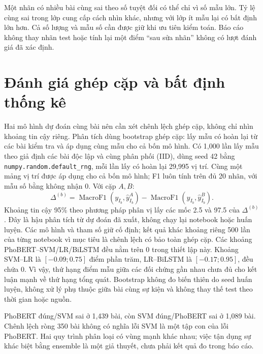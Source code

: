 Một nhãn có nhiều bài cùng sai theo số tuyệt đối có thể chỉ vì số mẫu lớn. Tỷ lệ cùng sai trong lớp cung cấp cách nhìn khác, nhưng với lớp ít mẫu lại có bất định lớn hơn. Cả số lượng và mẫu số cần được giữ khi ưu tiên kiểm toán. Báo cáo không thay nhãn test hoặc tính lại một điểm ``sau sửa nhãn'' không có lượt đánh giá đã xác định.

\FloatBarrier
\section{Đánh giá ghép cặp và bất định thống kê}

\label{sec:paired_comparison}
Hai mô hình dự đoán cùng bài nên cần xét chênh lệch ghép cặp, không chỉ nhìn khoảng tin cậy riêng. Phân tích dùng bootstrap ghép cặp: lấy mẫu có hoàn lại từ các bài kiểm tra và áp dụng cùng mẫu cho cả bốn mô hình. Có 1,000 lần lấy mẫu theo giả định các bài độc lập và cùng phân phối (IID), dùng seed 42 bằng \texttt{numpy.random.default\_rng}, mỗi lần lấy có hoàn lại 29,995 vị trí. Cùng một mảng vị trí được áp dụng cho cả bốn mô hình; F1 luôn tính trên đủ 20 nhãn, với mẫu số bằng không nhận 0. Với cặp $A,B$:
\begin{equation}
\Delta^{(b)}=\operatorname{MacroF1}(y_{I_b},\hat y^A_{I_b})-
\operatorname{MacroF1}(y_{I_b},\hat y^B_{I_b}).
\end{equation}
Khoảng tin cậy 95\% theo phương pháp phân vị lấy các mốc 2.5 và 97.5 của $\Delta^{(b)}$. Đây là hậu phân tích từ dự đoán đã xuất, không chạy lại notebook hoặc huấn luyện. Các mô hình và tham số giữ cố định; kết quả khác khoảng riêng 500 lần của từng notebook vì mục tiêu là chênh lệch có bảo toàn ghép cặp.
Các khoảng PhoBERT--SVM/LR/BiLSTM đều nằm trên 0 trong thiết lập này. Khoảng SVM--LR là $[-0.09;0.75]$ điểm phần trăm, LR--BiLSTM là $[-0.17;0.95]$, đều chứa 0. Vì vậy, thứ hạng điểm mẫu giữa các đối chứng gần nhau chưa đủ cho kết luận mạnh về thứ hạng tổng quát. Bootstrap không đo biến thiên do seed huấn luyện, không xử lý phụ thuộc giữa bài cùng sự kiện và không thay thế test theo thời gian hoặc nguồn.

PhoBERT đúng/SVM sai ở 1,439 bài, còn SVM đúng/PhoBERT sai ở 1,089 bài. Chênh lệch ròng 350 bài không có nghĩa lỗi SVM là một tập con của lỗi PhoBERT. Hai quy trình phân loại có vùng mạnh khác nhau; việc tận dụng sự khác biệt bằng ensemble là một giả thuyết, chưa phải kết quả đo trong báo cáo.


